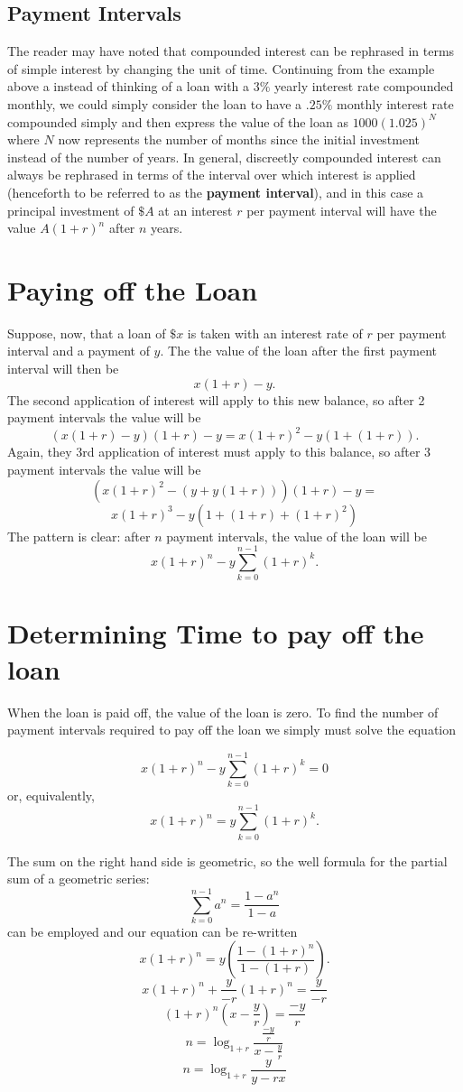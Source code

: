 \documentclass[11pt]{article} %
\begin{document}
\subsection{Payment Intervals}
The reader may have noted that compounded interest can be rephrased in terms of simple interest by changing the unit of time.  Continuing from the example above a instead of thinking of a loan with a $3\%$ yearly interest rate compounded monthly, we could simply consider the loan to have a $.25\%$ monthly interest rate compounded simply and then express the value of the loan as $1000(1.025)^{N}$ where $N$ now represents the number of months since the initial investment instead of the number of years. In general, discreetly compounded interest can always be rephrased in terms of the interval over which interest is applied (henceforth to be referred to as the {\bf payment interval}),  and in this case a principal investment of $\$A$ at an interest $r$ per payment interval will have the value $A(1+r)^n$ after $n$ years.

\section{Paying off the Loan}
Suppose, now, that a loan of $\$x$ is taken with an interest rate of $r$ per payment interval and a payment of $y$. The the value of the loan after the first payment interval will then be 
$$x(1+r) - y.$$
The second application of interest will apply to this new balance, so after 2 payment intervals the value will be 
$$(x(1+r)-y)(1+r) - y = x(1+r)^{2} - y(1 + (1+r)).$$
Again, they 3rd application of interest must apply to this balance, so after 3 payment intervals the value will be
$$\left(x(1+r)^{2} - (y + y(1+r))\right)(1+r) -y =$$
$$ x(1+r)^{3} - y\left(1 + (1+r) + (1+r)^{2}\right)$$
The pattern is clear:  after $n$ payment intervals, the value of the loan will be 
$$x(1+r)^n - y \sum_{k=0}^{n-1} (1+r)^{k}.$$

\section{Determining Time to pay off the loan}
When the loan is paid off, the value of the loan is zero. To find the number of payment intervals required to pay off the loan we simply must solve the equation

$$x(1+r)^n - y \sum_{k=0}^{n-1} (1+r)^{k} = 0$$
or, equivalently, 
$$x(1+r)^n = y \sum_{k=0}^{n-1} (1+r)^{k}.$$

The sum on the right hand side is geometric, so the well formula for the partial sum of a geometric series:
$$\sum_{k=0}^{n-1} a^{n} = \frac{1-a^{n}}{1-a}$$ can be employed and our equation can be re-written
$$x(1+r)^n = y \left(\frac {1 - (1+r)^{n}}{1 - (1+r)} \right).$$
$$x(1+r)^n + \frac{y}{-r}(1+r)^{n} = \frac{y}{-r}$$
$$ (1+r)^{n} (x - \frac{y}{r}) = \frac{-y}{r}$$
$$n = \log_{1+r} \frac{\frac{-y}{r}}{x - \frac{y}{r}}$$
$$n = \log_{1+r} \frac{y}{y - rx}$$
\end{document}
